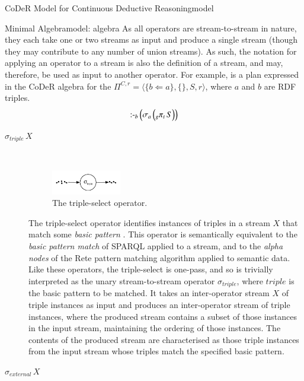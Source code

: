 \begin{nestedsection}{CoDeR Model for Continuous Deductive Reasoning}{model}
\begin{nestedsection}{Minimal Algebra}{model: algebra}
		As all operators are stream-to-stream in nature, they each take one or two streams as input and produce a single stream (though they may contribute to any number of union streams).
		As such, the notation for applying an operator to a stream is also the definition of a stream, and may, therefore, be used as input to another operator.
		For example,  is a plan expressed in the CoDeR algebra for the ${\Pi^{C,r} = \langle \{b \Leftarrow a\}, \{\}, S, r \rangle}$, where $a$ and $b$ are RDF triples.
		\begin{equation}\labeleqn{basic-example-plan}
			\text{:-}_b \left( \sigma_a \left( {}_g{\pi_t}\,S \right) \right)
		\end{equation}

		\begin{description}
			\item[$\sigma_{triple}\,X$] \hfill \\
				\begin{figure}[t]
					\centering
					\includegraphics[width=0.3\textwidth]{basic-pattern-match}
					\caption{The triple-select operator.}
				\end{figure}
				The triple-select operator identifies instances of triples in a stream $X$ that match some \emph{basic pattern} \citep{w3csparql}.
				This operator is semantically equivalent to the \emph{basic pattern match} of SPARQL applied to a stream, and to the \emph{alpha nodes} of the Rete pattern matching algorithm \citep{forgy79} applied to semantic data.
				Like these operators, the triple-select is one-pass, and so is trivially interpreted as the unary stream-to-stream operator $\sigma_{triple}$, where ${triple}$ is the basic pattern to be matched.
				It takes an inter-operator stream $X$ of triple instances as input and produces an inter-operator stream of triple instances, where the produced stream contains a subset of those instances in the input stream, maintaining the ordering of those instances.
				The contents of the produced stream are characterised as those triple instances from the input stream whose triples match the specified basic pattern.
			\item[$\sigma_{external}\,X$] \hfill \\
				\begin{figure}[b]

\end{figure}
\end{description}
\end{nestedsection}
\end{nestedsection}
